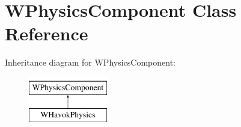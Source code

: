 \hypertarget{class_w_physics_component}{}\section{W\+Physics\+Component Class Reference}
\label{class_w_physics_component}
Inheritance diagram for W\+Physics\+Component\+:\begin{figure}[H]
\begin{center}
\leavevmode
\includegraphics[height=2.000000cm]{class_w_physics_component}
\end{center}
\end{figure}
